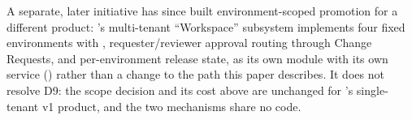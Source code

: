 A separate, later initiative has since built environment-scoped promotion for a
different product: \sys's multi-tenant ``Workspace'' subsystem implements four
fixed environments with , requester/reviewer approval
routing through Change Requests, and per-environment release state, as its own
module with its own service () rather than
a change to the path this paper describes. It does not resolve D9: the scope
decision and its cost above are unchanged for \sys's single-tenant v1 product, and
the two mechanisms share no code.
